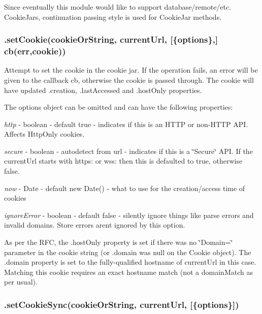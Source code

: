 Since eventually this module would like to support database/remote/etc. Cookie\+Jars, continuation passing style is used for Cookie\+Jar methods.

\subsubsection*{{\ttfamily .set\+Cookie(cookie\+Or\+String, current\+Url, \mbox{[}\{options\},\mbox{]} cb(err,cookie))}}

Attempt to set the cookie in the cookie jar. If the operation fails, an error will be given to the callback {\ttfamily cb}, otherwise the cookie is passed through. The cookie will have updated {\ttfamily .creation}, {\ttfamily .last\+Accessed} and {\ttfamily .host\+Only} properties.

The {\ttfamily options} object can be omitted and can have the following properties\+:


\begin{DoxyItemize}
\item {\itshape http} -\/ boolean -\/ default {\ttfamily true} -\/ indicates if this is an H\+T\+TP or non-\/\+H\+T\+TP A\+PI. Affects Http\+Only cookies.
\item {\itshape secure} -\/ boolean -\/ autodetect from url -\/ indicates if this is a \char`\"{}\+Secure\char`\"{} A\+PI. If the current\+Url starts with {\ttfamily https\+:} or {\ttfamily wss\+:} then this is defaulted to {\ttfamily true}, otherwise {\ttfamily false}.
\item {\itshape now} -\/ Date -\/ default {\ttfamily new Date()} -\/ what to use for the creation/access time of cookies
\item {\itshape ignore\+Error} -\/ boolean -\/ default {\ttfamily false} -\/ silently ignore things like parse errors and invalid domains. {\ttfamily Store} errors aren\textquotesingle{}t ignored by this option.
\end{DoxyItemize}

As per the R\+FC, the {\ttfamily .host\+Only} property is set if there was no \char`\"{}\+Domain=\char`\"{} parameter in the cookie string (or {\ttfamily .domain} was null on the Cookie object). The {\ttfamily .domain} property is set to the fully-\/qualified hostname of {\ttfamily current\+Url} in this case. Matching this cookie requires an exact hostname match (not a {\ttfamily domain\+Match} as per usual).

\subsubsection*{{\ttfamily .set\+Cookie\+Sync(cookie\+Or\+String, current\+Url, \mbox{[}\{options\}\mbox{]})}}

